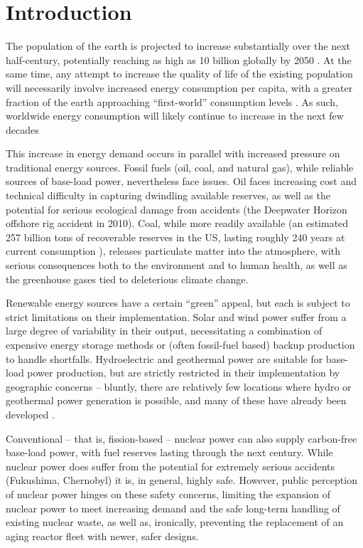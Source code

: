\chapter{Introduction}\label{ch:Introduction}

The population of the earth is projected to increase substantially over the next half-century, potentially reaching as high as 10 billion globally by 2050 \cite{World2010}.  At the same time, any attempt to increase the quality of life of the existing population will necessarily involve increased energy consumption per capita, with a greater fraction of the earth approaching ``first-world'' consumption levels \cite{HDI2011}.  As such, worldwide energy consumption will likely continue to increase in the next few decades \cite{EIA2011,BP2010}

This increase in energy demand occurs in parallel with increased pressure on traditional energy sources.  Fossil fuels (oil, coal, and natural gas), while reliable sources of base-load power, nevertheless face issues.  Oil faces increasing cost and technical difficulty in capturing dwindling available reserves, as well as the potential for serious ecological damage from accidents (\eg the Deepwater Horizon offshore rig accident in 2010).  Coal, while more readily available (an estimated 257 billion tons of recoverable reserves in the US, lasting roughly 240 years at current consumption \cite{BP2010,EIA2013}), releases particulate matter into the atmosphere, with serious consequences both to the environment and to human health, as well as the greenhouse gases tied to deleterious climate change.  

Renewable energy sources have a certain ``green'' appeal, but each is subject to strict limitations on their implementation.  Solar and wind power suffer from a large degree of variability in their output, necessitating a combination of expensive energy storage methods or (often fossil-fuel based) backup production to handle shortfalls.  Hydroelectric and geothermal power are suitable for base-load power production, but are strictly restricted in their implementation by geographic concerns -- bluntly, there are relatively few locations where hydro or geothermal power generation is possible, and many of these have already been developed .

Conventional -- that is, fission-based -- nuclear power can also supply carbon-free base-load power, with fuel reserves lasting through the next century.  While nuclear power does  suffer from the potential for extremely serious accidents (Fukushima, Chernobyl) it is, in general, highly safe.  However, public perception of nuclear power hinges on these safety concerns, limiting the expansion of nuclear power to meet increasing demand and the safe long-term handling of existing nuclear waste, as well as, ironically, preventing the replacement of an aging reactor fleet with newer, safer designs.

